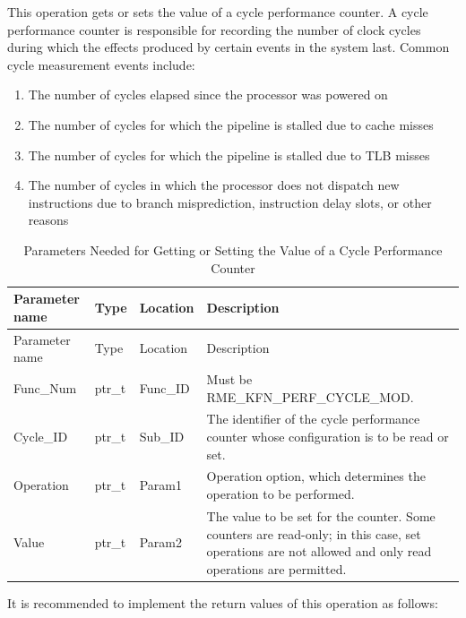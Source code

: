 This operation gets or sets the value of a cycle performance counter. A cycle performance counter is responsible for recording the number of clock cycles during which the effects produced by certain events in the system last. Common cycle measurement events include:

\begin{enumerate}
\def\labelenumi{\arabic{enumi}.}
\item
  The number of cycles elapsed since the processor was powered on
\item
  The number of cycles for which the pipeline is stalled due to cache misses
\item
  The number of cycles for which the pipeline is stalled due to TLB misses
\item
  The number of cycles in which the processor does not dispatch new instructions due to branch misprediction, instruction delay slots, or other reasons
\end{enumerate}

\begin{xltabular}{\textwidth}{@{}>{\hsize\raggedright\arraybackslash}X>{\hsize\raggedright\arraybackslash}X>{\hsize\raggedright\arraybackslash}X>{\hsize\raggedright\arraybackslash}X@{}}
\caption{Parameters Needed for Getting or Setting the Value of a Cycle Performance Counter}\label{tab:8-64-get-or-set-cycle-performance-counter-parameters}\\
\toprule
Parameter name & Type & Location & Description\tabularnewline
\endfirsthead
\toprule
Parameter name & Type & Location & Description\tabularnewline
\midrule
\endhead
\bottomrule
\endlastfoot
Func\_Num & ptr\_t & Func\_ID & Must be RME\_KFN\_PERF\_CYCLE\_MOD.\tabularnewline
Cycle\_ID & ptr\_t & Sub\_ID &
The identifier of the cycle performance counter whose configuration is to be read or set.\tabularnewline
Operation & ptr\_t & Param1 &
Operation option, which determines the operation to be performed.\tabularnewline
Value & ptr\_t & Param2 &
The value to be set for the counter. Some counters are read-only; in this case, set operations are not allowed and only read operations are permitted.\tabularnewline
\end{xltabular}
\nopagebreak[4]

It is recommended to implement the return values of this operation as follows:

